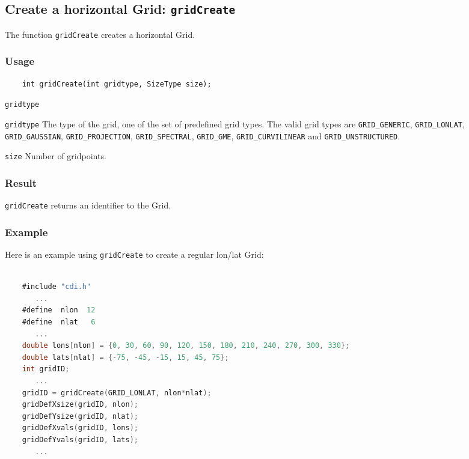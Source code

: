 

\subsection{Create a horizontal Grid: \texttt{gridCreate}}
\label{gridCreate}

The function {\texttt{gridCreate}} creates a horizontal Grid.

\subsubsection*{Usage}

\begin{verbatim}
    int gridCreate(int gridtype, SizeType size);
\end{verbatim}

\hspace*{4mm}\begin{minipage}[]{15cm}
\begin{deflist}{\texttt{gridtype}\ }
\item[\texttt{gridtype}]
The type of the grid, one of the set of predefined {\CDI} grid types.
                     The valid {\CDI} grid types are {\texttt{GRID\_GENERIC}}, {\texttt{GRID\_LONLAT}},
                     {\texttt{GRID\_GAUSSIAN}}, {\texttt{GRID\_PROJECTION}}, {\texttt{GRID\_SPECTRAL}},
                     {\texttt{GRID\_GME}}, {\texttt{GRID\_CURVILINEAR}} and {\texttt{GRID\_UNSTRUCTURED}}.
\item[\texttt{size}]
Number of gridpoints.

\end{deflist}
\end{minipage}

\subsubsection*{Result}

{\texttt{gridCreate}} returns an identifier to the Grid.


\subsubsection*{Example}

Here is an example using {\texttt{gridCreate}} to create a regular lon/lat Grid:

\begin{lstlisting}[language=C, backgroundcolor=\color{pyellow}, basicstyle=\small, columns=flexible]

    #include "cdi.h"
       ...
    #define  nlon  12
    #define  nlat   6
       ...
    double lons[nlon] = {0, 30, 60, 90, 120, 150, 180, 210, 240, 270, 300, 330};
    double lats[nlat] = {-75, -45, -15, 15, 45, 75};
    int gridID;
       ...
    gridID = gridCreate(GRID_LONLAT, nlon*nlat);
    gridDefXsize(gridID, nlon);
    gridDefYsize(gridID, nlat);
    gridDefXvals(gridID, lons);
    gridDefYvals(gridID, lats);
       ...
\end{lstlisting}


